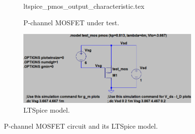 \documentclass[12pt]{book}
\begin{document}
\begin{figure}[ht]
    \centering
    \begin{subfigure}{0.45\linewidth}
        \centering
        {ltspice_pmos_output_characteristic.tex}
        \caption{P-channel MOSFET under test.}
        \label{fig:circuit_mosfet_output_characteristic}
    \end{subfigure}
    \begin{subfigure}{0.45\linewidth}
        \centering
        \includegraphics[width=\linewidth]{../images/ltspice_pmos_output_characteristic.png}
        \caption{LTSpice model.}
        \label{fig:ltspice_mosfet_output_characteristic}
    \end{subfigure}
    \caption{P-channel MOSFET circuit and its LTSpice model.}
\end{figure}
\end{document}
